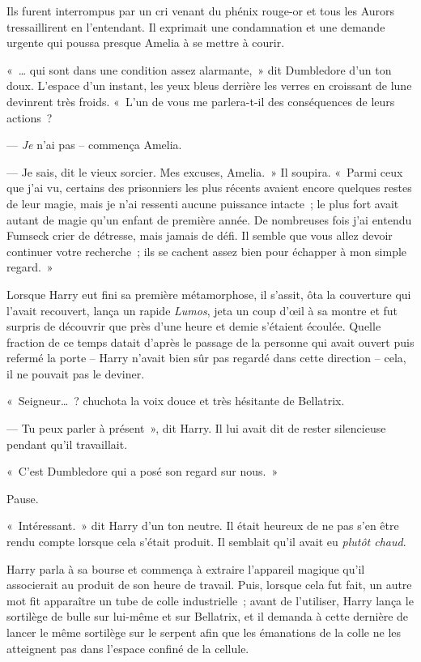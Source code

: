 Ils furent interrompus par un cri venant du phénix rouge-or et tous les Aurors tressaillirent en l'entendant. Il exprimait une condamnation et une demande urgente qui poussa presque Amelia à se mettre à courir.

«~… qui sont dans une condition assez alarmante,~» dit Dumbledore d'un ton doux. L'espace d'un instant, les yeux bleus derrière les verres en croissant de lune devinrent très froids. «~L'un de vous me parlera-t-il des conséquences de leurs actions~?

--- \emph{Je} n'ai pas --  commença Amelia.

--- Je sais, dit le vieux sorcier. Mes excuses, Amelia.~» Il soupira. «~Parmi ceux que j'ai vu, certains des prisonniers les plus récents avaient encore quelques restes de leur magie, mais je n'ai ressenti aucune puissance intacte~; le plus fort avait autant de magie qu'un enfant de première année. De nombreuses fois j'ai entendu Fumseck crier de détresse, mais jamais de défi. Il semble que vous allez devoir continuer votre recherche~; ils se cachent assez bien pour échapper à mon simple regard.~»

\later

Lorsque Harry eut fini sa première métamorphose, il s'assit, ôta la couverture qui l'avait recouvert, lança un rapide \emph{Lumos}, jeta un coup d'œil à sa montre et fut surpris de découvrir que près d'une heure et demie s'étaient écoulée. Quelle fraction de ce temps datait d'après le passage de la personne qui avait ouvert puis refermé la porte -- Harry n'avait bien sûr pas regardé dans cette direction -- cela, il ne pouvait pas le deviner.

«~Seigneur…~? chuchota la voix douce et très hésitante de Bellatrix.

--- Tu peux parler à présent~», dit Harry. Il lui avait dit de rester silencieuse pendant qu'il travaillait.

«~C'est Dumbledore qui a posé son regard sur nous.~»

Pause.

«~Intéressant.~» dit Harry d'un ton neutre. Il était heureux de ne pas s'en être rendu compte lorsque cela s'était produit. Il semblait qu'il avait eu \emph{plutôt chaud}.

Harry parla à sa bourse et commença à extraire l'appareil magique qu'il associerait au produit de son heure de travail. Puis, lorsque cela fut fait, un autre mot fit apparaître un tube de colle industrielle~; avant de l'utiliser, Harry lança le sortilège de bulle sur lui-même et sur Bellatrix, et il demanda à cette dernière de lancer le même sortilège sur le serpent afin que les émanations de la colle ne les atteignent pas dans l'espace confiné de la cellule.


